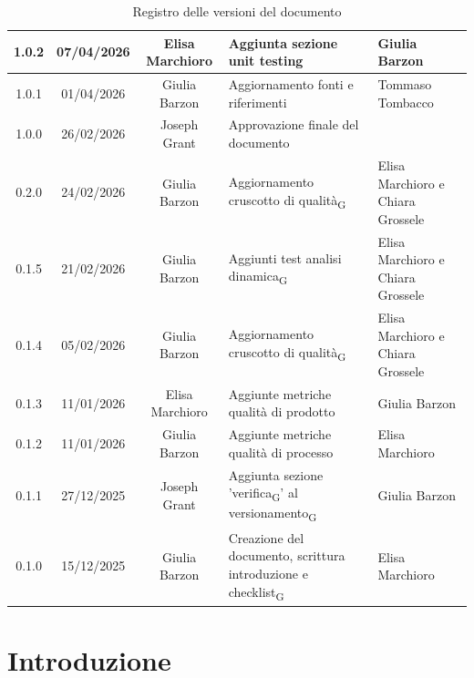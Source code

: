 \documentclass[11pt,a4paper]{article}
\newcommand{\gls}[1]{#1\textsubscript{G}}
\begin{document}
\begin{table}[H]
\begin{tabular}{|c|c|c|>{\raggedright\arraybackslash}p{}|p{}|}
        \hline
        1.0.2 & 07/04/2026 & Elisa Marchioro & Aggiunta sezione unit testing & Giulia Barzon\\
        \hline
        1.0.1 & 01/04/2026 & Giulia Barzon & Aggiornamento fonti e riferimenti & Tommaso Tombacco \\
        \hline
        1.0.0 & 26/02/2026 & Joseph Grant & Approvazione finale del documento &  \\
        \hline
        0.2.0 & 24/02/2026 & Giulia Barzon & Aggiornamento \gls{cruscotto di qualità} & Elisa Marchioro e Chiara Grossele\\
        \hline
        0.1.5 & 21/02/2026 & Giulia Barzon & Aggiunti test \gls{analisi dinamica} & Elisa Marchioro e Chiara Grossele\\
        \hline
        0.1.4 & 05/02/2026 & Giulia Barzon & Aggiornamento \gls{cruscotto di qualità} & Elisa Marchioro e Chiara Grossele\\
        \hline
        0.1.3 & 11/01/2026 & Elisa Marchioro & Aggiunte metriche qualità di prodotto & Giulia Barzon \\
        \hline
        0.1.2 & 11/01/2026 & Giulia Barzon & Aggiunte metriche qualità di processo & Elisa Marchioro\\
        \hline
        0.1.1 & 27/12/2025 & Joseph Grant & Aggiunta sezione '\gls{verifica}' al \gls{versionamento} & Giulia Barzon\\
        \hline
        0.1.0 & 15/12/2025 & Giulia Barzon & Creazione del documento, scrittura introduzione e \gls{checklist} & Elisa Marchioro\\
        \hline
    \end{tabular}
    \caption{Registro delle versioni del documento}
    \label{tab:versionamento}
\end{table}

\newpage

\tableofcontents
\thispagestyle{empty}
\newpage

\setcounter{page}{1}

\newcommand{\prossimoUT}{UT-\arabic{codiceUT}\stepcounter{codiceUT}}

\newcommand{\prossimoCT}{CT-\arabic{codiceCT}\stepcounter{codiceCT}}

\newcommand{\prossimoIT}{IT-\arabic{codiceIT}\stepcounter{codiceIT}}

\section{Introduzione}
\end{document}
